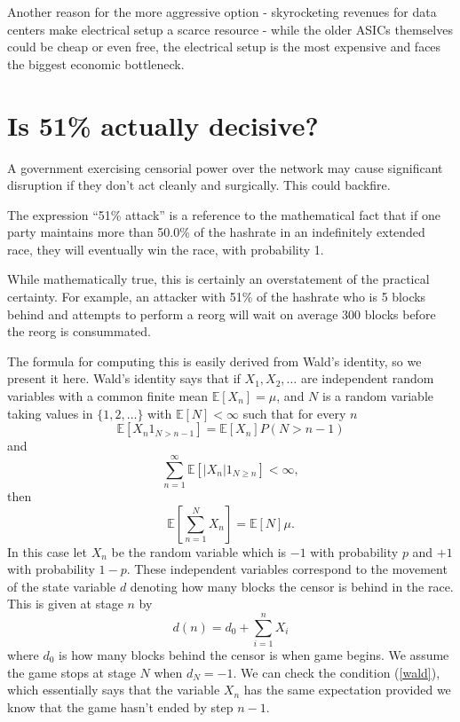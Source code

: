 \documentclass{article}%
\begin{document}
Another reason for the more aggressive option - skyrocketing revenues for data centers make electrical setup a scarce resource - while the older ASICs themselves could be cheap or even free, the electrical setup is the most expensive and faces the biggest economic bottleneck.  

\section{Is 51\% actually decisive? \label{hoef}  }

A government exercising censorial power over the network may cause
significant disruption if they don't act cleanly and surgically.  This could backfire.

The expression \textquotedblleft51\% attack'' is a reference to the
mathematical fact that if one party maintains more than 50.0\% of the
hashrate in an indefinitely extended race, they will eventually win the race,
with probability 1.

While mathematically true, this is certainly an overstatement of the practical
certainty.  For example, an attacker with 51\% of the hashrate who is 5
blocks behind and attempts to perform a reorg will wait on average 300 blocks
before the reorg is consummated.

The formula for computing this is easily derived from Wald's identity, so we
present it here. Wald's identity says that if $X_{1},X_{2},\dots$ are independent random
variables with a common finite mean $\mathbb{E}\left[  X_{n}\right]  =\mu$, and $N$ is a random variable
taking values in $\{1,2,\dots\}$ with $\mathbb{E}\left[  N\right]  <\infty$ such that for every $n$
\begin{equation}
\mathbb{E}\left[  X_{n}1_{N>n-1}\right]  =\mathbb{E}\left[  X_{n}\right]
P\left(  N>n-1\right)  \label{wald}%
\end{equation}
and
\[
\sum_{n=1}^{\infty}\mathbb{E}\left[  \left\vert X_{n}\right\vert 1_{N\geq n}\right]  <\infty,
\]
then
\[
\mathbb{E}\left[  \sum_{n=1}^{N}X_{n}\right]  =\mathbb{E}\left[  N\right]
\mu.
\]
In this case let $X_{n}$ be the random variable which is $-1$ with probability
$p$ and $+1$ with probability $1-p$. These independent variables correspond
to the movement of the state variable $d$ denoting how many blocks the censor is behind in the race.  This is given at stage $n$ by
\[
d(n)=d_{0}+\sum_{i=1}^{n}X_{i}%
\]
where $d_{0}$ is how many blocks behind the censor is when game begins.  We assume the game
stops at stage $N$ when $d_{N}=-1.$ We can check the condition (\ref{wald}),
which essentially says that the variable $X_{n}$ has the same expectation
provided we know that the game hasn't ended by step $n-1.$
\end{document}
